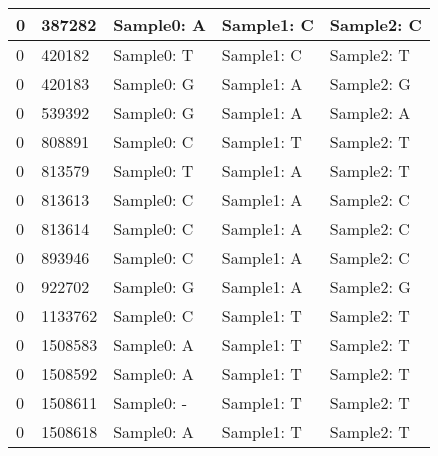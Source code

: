 \begin{longtable}{|l|l|l|l|l|}
	\hline
	0                              & 387282               & Sample0: A                  & Sample1: C           & Sample2: C            \\ 
	\hline
	0                              & 420182               & Sample0: T                  & Sample1: C           & Sample2: T            \\ 
	\hline
	0                              & 420183               & Sample0: G                  & Sample1: A           & Sample2: G            \\ 
	\hline
	0                              & 539392               & Sample0: G                  & Sample1: A           & Sample2: A            \\ 
	\hline
	0                              & 808891               & Sample0: C                  & Sample1: T           & Sample2: T            \\ 
	\hline
	0                              & 813579               & Sample0: T                  & Sample1: A           & Sample2: T            \\ 
	\hline
	0                              & 813613               & Sample0: C                  & Sample1: A           & Sample2: C            \\ 
	\hline
	0                              & 813614               & Sample0: C                  & Sample1: A           & Sample2: C            \\ 
	\hline
	0                              & 893946               & Sample0: C                  & Sample1: A           & Sample2: C            \\ 
	\hline
	0                              & 922702               & Sample0: G                  & Sample1: A           & Sample2: G            \\ 
	\hline
	0                              & 1133762              & Sample0: C                  & Sample1: T           & Sample2: T            \\ 
	\hline
	0                              & 1508583              & Sample0: A                  & Sample1: T           & Sample2: T            \\ 
	\hline
	0                              & 1508592              & Sample0: A                  & Sample1: T           & Sample2: T            \\ 
	\hline
	0                              & 1508611              & Sample0: -                  & Sample1: T           & Sample2: T            \\ 
	\hline
	0                              & 1508618              & Sample0: A                  & Sample1: T           & Sample2: T            \\ 

\end{longtable}

